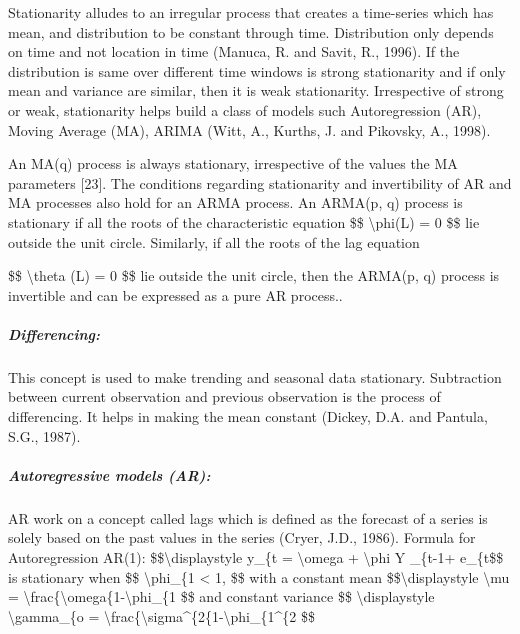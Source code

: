 \documentclass[
  letterpaper,
  DIV=11,
  numbers=noendperiod]{scrartcl}
\let\oldsubparagraph\subparagraph
\renewcommand{\subparagraph}[1]{\oldsubparagraph{#1}\mbox{}}
\begin{document}
Stationarity alludes to an irregular process that creates a time-series
which has mean, and distribution to be constant through time.
Distribution only depends on time and not location in time (Manuca, R.
and Savit, R., 1996). If the distribution is same over different time
windows is strong stationarity and if only mean and variance are
similar, then it is weak stationarity. Irrespective of strong or weak,
stationarity helps build a class of models such Autoregression (AR),
Moving Average (MA), ARIMA (Witt, A., Kurths, J. and Pikovsky, A.,
1998).

An MA(q) process is always stationary, irrespective of the values the MA
parameters {[}23{]}. The conditions regarding stationarity and
invertibility of AR and MA processes also hold for an ARMA process. An
ARMA(p, q) process is stationary if all the roots of the characteristic
equation \$\$ \textbackslash phi(L) = 0 \$\$ lie outside the unit
circle. Similarly, if all the roots of the lag equation

\$\$ \textbackslash theta (L) = 0 \$\$ lie outside the unit circle, then
the ARMA(p, q) process is invertible and can be expressed as a pure AR
process..

\hypertarget{differencing}{%
\subparagraph{\texorpdfstring{\textbf{Differencing:}}{Differencing:}}\label{differencing}}

This concept is used to make trending and seasonal data stationary.
Subtraction between current observation and previous observation is the
process of differencing. It helps in making the mean constant (Dickey,
D.A. and Pantula, S.G., 1987).

\hypertarget{autoregressive-models-ar}{%
\subparagraph{\texorpdfstring{\textbf{Autoregressive models
(AR):}}{Autoregressive models (AR):}}\label{autoregressive-models-ar}}

AR work on a concept called lags which is defined as the forecast of a
series is solely based on the past values in the series (Cryer, J.D.,
1986). Formula for Autoregression AR(1): \$\$\textbackslash displaystyle
y\_\{t = \textbackslash omega + \textbackslash phi Y \_\{t-1+ e\_\{t\$\$
is stationary when \$\$ \textbar\textbackslash phi\_\{1\textbar{}
\textless{} 1, \$\$ with a constant mean \$\$\textbackslash displaystyle
\textbackslash mu =
\textbackslash frac\{\textbackslash omega\{1-\textbackslash phi\_\{1
\$\$ and constant variance \$\$ \textbackslash displaystyle
\textbackslash gamma\_\{o =
\textbackslash frac\{\textbackslash sigma\^{}\{2\{1-\textbackslash phi\_\{1\^{}\{2
\$\$
\end{document}
